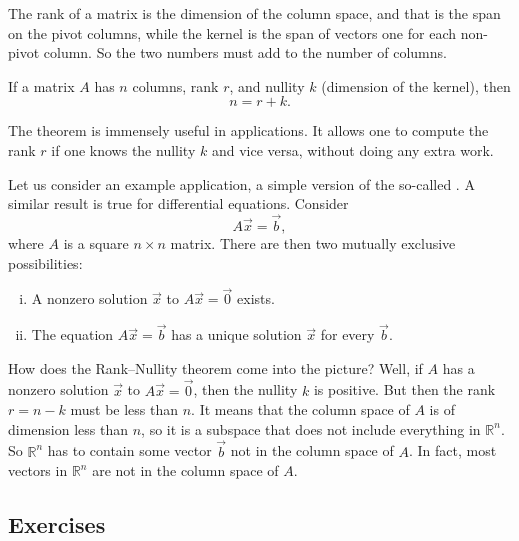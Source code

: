 The rank of a matrix is the dimension of the column space, and that is
the span on the pivot columns, while the kernel is the span of vectors
one for each non-pivot column.  So the two numbers must add to the number of
columns.

\begin{theorem}
If a matrix $A$ has $n$ columns, rank $r$, and nullity $k$ (dimension of the
kernel), then
\begin{equation*}
n = r+k .
\end{equation*}
\end{theorem}

The theorem is immensely useful in applications.  It allows one to compute
the rank $r$ if one knows the nullity $k$ and vice versa, without doing any
extra work.

Let us consider an example application, a simple version of the so-called
\emph{}.  A similar result is true for
differential equations.  Consider
\begin{equation*}
A \vec{x} = \vec{b} ,
\end{equation*}
where $A$ is a square $n \times n$ matrix.
There are then two mutually exclusive possibilities:
\begin{enumerate}[(i)]
\item
A nonzero solution $\vec{x}$ to $A \vec{x} = \vec{0}$ exists.
\item
The equation $A \vec{x} = \vec{b}$ has a unique solution $\vec{x}$ for every
$\vec{b}$.
\end{enumerate}
How does the Rank--Nullity theorem come into the picture?  Well, if $A$ has
a nonzero solution $\vec{x}$ to $A \vec{x} = \vec{0}$, then the nullity $k$ is
positive.  But then the rank $r = n-k$ must be less than $n$.
It means that the column space of $A$ is of dimension less than $n$, so it is
a subspace that does not include everything in ${\mathbb{R}}^n$.
So ${\mathbb{R}}^n$ has to
contain some vector $\vec{b}$ not in the column space of $A$.  In fact, most
vectors in ${\mathbb{R}}^n$ are not in the column space of $A$.



\subsection{Exercises}

